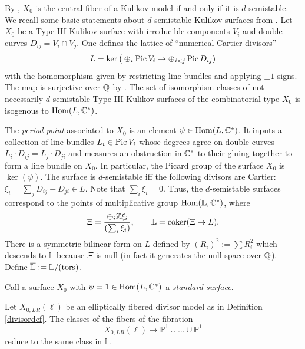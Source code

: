 \documentclass[table,x11names]{amsart}
\begin{document}
By \cite{friedman1983global-smoothings}, $X_0$ is the central fiber of a Kulikov model
if and only if it is $d$-semistable. We recall some basic statements about $d$-semistable Kulikov
surfaces from \cite{friedman1986type-III, laza2008triangulations,
  gross2015moduli-of-surfaces}.  Let $X_0$ be a Type III Kulikov surface
with irreducible components $V_i$ and double curves
$D_{ij}=V_i\cap V_j$.
One defines the lattice of ``numerical Cartier divisors''
\begin{displaymath}
  L = \ker\big( \oplus_i \operatorname{Pic} V_i \to \oplus_{i<j} \operatorname{Pic} D_{ij} )
\end{displaymath}
with the homomorphism given by restricting line bundles and applying
$\pm1$ signs.
The map is surjective over ${\mathbb Q}$ by \cite[Prop. 7.2]{friedman1986type-III}.
The set of
isomorphism classes of not necessarily $d$-semistable Type III
Kulikov surfaces of the combinatorial type $X_0$ is isogenous to
$\operatorname{Hom}(L, {\mathbb C}^*)$.

The {\it period point} \cite[Sec.~3]{friedman1986type-III}
associated to $X_0$ is an element $\psi \in \operatorname{Hom}(L,{\mathbb C}^*)$.
It inputs a collection of line bundles $L_i\in \operatorname{Pic} V_i$ whose
degrees agree on double curves $L_i\cdot D_{ij} = L_j\cdot D_{ji}$ and measures
an obstruction in $\mathbb{C}^*$ to their gluing together to form a line bundle on $X_0$.
In particular, the Picard group of the surface $X_0$ is $\ker(\psi)$. The surface is $d$-semistable
iff the following divisors are Cartier:
$\xi_i = \sum_j D_{ij}-D_{ji} \in L$. Note that $\sum_i
\xi_i=0$. Thus, the $d$-semistable surfaces correspond to the points
of multiplicative group $\operatorname{Hom}({\mathbb L},{\mathbb C}^*)$, where 
\begin{displaymath}
  \Xi = \frac{ \oplus_i {\mathbb Z}\xi_i }{ (\sum_i \xi_i)},
  \qquad
  {\mathbb L} = \operatorname{coker}(\Xi\to L).
\end{displaymath}
There is a symmetric bilinear form on
$L$ defined by $(R_i)^2:=\sum R_i^2$ which descends to $\mathbb{L}$
because $\Xi$ is null (in fact it generates
 the null space over $\mathbb{Q}$). Define
 $\overline{\mathbb{L}}:=\mathbb{L}/(\rm tors)$.

\begin{definition} Call a surface $X_0$ with $\psi=1\in \operatorname{Hom}(L,\mathbb{C}^*)$
a {\it standard surface}. \end{definition}

\begin{proposition}\label{prop:dss-fiber} Let $X_{0,LR}(\ell)$ be an elliptically fibered divisor model
as in Definition \ref{divisordef}. The classes of the fibers of the fibration
$$X_{0,LR}(\ell)\to \mathbb{P}^1\cup \dots \cup \mathbb{P}^1$$ reduce to the same
class in $\mathbb{L}$.  \end{proposition}
\end{document}
